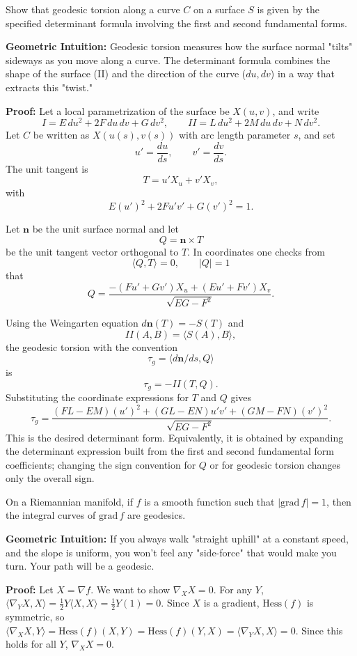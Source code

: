 \begin{exercise}
\label{geometry:2017:9}
Show that geodesic torsion along a curve $C$ on a surface $S$ is given by the specified determinant formula involving the first and second fundamental forms.
\end{exercise}

\begin{solution}
\textbf{Geometric Intuition:} Geodesic torsion measures how the surface normal "tilts" sideways as you move along a curve. The determinant formula combines the shape of the surface (II) and the direction of the curve ($du, dv$) in a way that extracts this "twist."

\textbf{Proof:}
Let a local parametrization of the surface be $X(u,v)$, and write
\[
I=E\,du^2+2F\,du\,dv+G\,dv^2,
\qquad
II=L\,du^2+2M\,du\,dv+N\,dv^2.
\]
Let $C$ be written as $X(u(s),v(s))$ with arc length parameter $s$, and set
\[
u'=\frac{du}{ds},\qquad v'=\frac{dv}{ds}.
\]
The unit tangent is
\[
T=u'X_u+v'X_v,
\]
with
\[
E(u')^2+2Fu'v'+G(v')^2=1.
\]

Let $\mathbf{n}$ be the unit surface normal and let
\[
Q=\mathbf{n}\times T
\]
be the unit tangent vector orthogonal to $T$. In coordinates one checks from
\[
\langle Q,T\rangle=0,\qquad |Q|=1
\]
that
\[
Q=
\frac{-(Fu'+Gv')X_u+(Eu'+Fv')X_v}{\sqrt{EG-F^2}}.
\]

Using the Weingarten equation $d\mathbf{n}(T)=-S(T)$ and
\[
II(A,B)=\langle S(A),B\rangle,
\]
the geodesic torsion with the convention
\[
\tau_g=\langle d\mathbf{n}/ds,Q\rangle
\]
is
\[
\tau_g=-II(T,Q).
\]
Substituting the coordinate expressions for $T$ and $Q$ gives
\[
\tau_g
=
\frac{(FL-EM)(u')^2+(GL-EN)u'v'+(GM-FN)(v')^2}
{\sqrt{EG-F^2}}.
\]
This is the desired determinant form. Equivalently, it is obtained by expanding the determinant expression built from the first and second fundamental form coefficients; changing the sign convention for $Q$ or for geodesic torsion changes only the overall sign.
\end{solution}

\begin{exercise}
\label{geometry:2017:10}
On a Riemannian manifold, if $f$ is a smooth function such that $|\mathrm{grad}\,f| = 1$, then the integral curves of $\mathrm{grad}\,f$ are geodesics.
\end{exercise}

\begin{solution}
\textbf{Geometric Intuition:} If you always walk "straight uphill" at a constant speed, and the slope is uniform, you won't feel any "side-force" that would make you turn. Your path will be a geodesic.

\textbf{Proof:} Let $X = \nabla f$. We want to show $\nabla_X X = 0$.
For any $Y$, $\langle \nabla_Y X, X \rangle = \frac{1}{2} Y \langle X, X \rangle = \frac{1}{2} Y(1) = 0$.
Since $X$ is a gradient, $\text{Hess}(f)$ is symmetric, so $\langle \nabla_X X, Y \rangle = \text{Hess}(f)(X, Y) = \text{Hess}(f)(Y, X) = \langle \nabla_Y X, X \rangle = 0$.
Since this holds for all $Y$, $\nabla_X X = 0$.
\end{solution}
